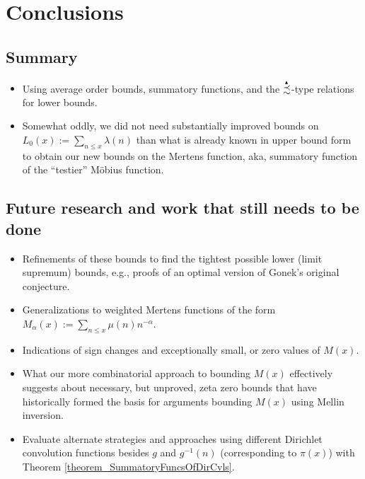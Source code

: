 \documentclass[11pt,reqno,a4letter]{article}
\numberwithin{figure}{section}
\numberwithin{table}{section}
\theoremstyle{plain}
\numberwithin{theorem}{section}
\theoremstyle{definition}
\newcommand{\PrecSim}[0]{\overset{_{\scriptsize{\blacktriangle}}}{\precsim}}
\begin{document}
\newpage 
\section{Conclusions} 

\subsection{Summary} 

\begin{itemize} 

\item Using average order bounds, summatory functions, and the $\PrecSim$-type relations for lower bounds. 
\item Somewhat oddly, we did not need substantially improved bounds on $L_0(x) := \sum_{n \leq x} \lambda(n)$ 
      than what is already known in upper bound form to obtain 
      our new bounds on the Mertens function, aka, summatory function of the ``testier'' M\"obius function. 

\end{itemize} 

\subsection{Future research and work that still needs to be done} 

\begin{itemize} 

\item Refinements of these bounds to find the tightest possible lower (limit supremum) bounds, e.g., proofs of an 
      optimal version of Gonek's original conjecture. 
\item Generalizations to weighted Mertens functions of the form $M_{\alpha}(x) := \sum_{n \leq x} \mu(n) n^{-\alpha}$. 
\item Indications of sign changes and exceptionally small, or zero values of $M(x)$. 
\item What our more combinatorial approach to bounding $M(x)$ effectively suggests about necessary, but unproved, 
      zeta zero bounds that have historically formed the basis for arguments bounding $M(x)$ using Mellin inversion. 
\item Evaluate alternate strategies and approaches using different Dirichlet convolution functions 
      besides $g$ and $g^{-1}(n)$ (corresponding to $\pi(x)$) 
      with Theorem \ref{theorem_SummatoryFuncsOfDirCvls}. 

\end{itemize} 
\end{document}
